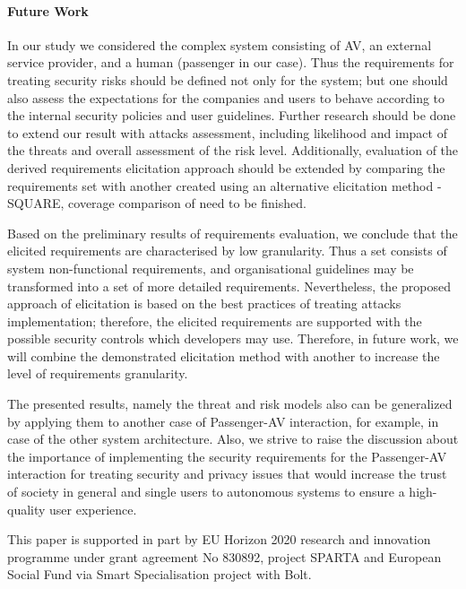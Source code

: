 \documentclass[manuscript]{acmart}
\begin{document}
\paragraph{Future Work} In our study we considered the complex system consisting of AV, an external service provider, and a human (passenger in our case). Thus the requirements for treating security risks should be defined not only for the system; but one should also assess the expectations for the companies and users to behave according to the internal security policies and user guidelines. Further research should be done to extend our result with attacks assessment, including likelihood and impact of the threats and overall assessment of the risk level. Additionally, evaluation of the derived requirements elicitation approach should be extended by comparing the requirements set with another created using an alternative elicitation method - SQUARE, coverage comparison of need to be finished.

Based on the preliminary results of requirements evaluation, we conclude that the elicited requirements are characterised by low granularity. Thus a set consists of system non-functional requirements, and organisational guidelines may be transformed into a set of more detailed requirements. Nevertheless, the proposed approach of elicitation is based on the best practices of treating attacks implementation; therefore, the elicited requirements are supported with the possible security controls which developers may use. Therefore, in future work, we will combine the demonstrated elicitation method with another to increase the level of requirements granularity.

The presented results, namely the threat and risk models also can be generalized by applying them to another case of Passenger-AV interaction, for example, in case of the other system architecture. Also, we strive to raise the discussion about the importance of implementing the security requirements for the Passenger-AV interaction for treating security and privacy issues that would increase the trust of society in general and single users to autonomous systems to ensure a high-quality user experience.



\begin{acks}
 This paper is supported in part by EU Horizon 2020 research and innovation programme under grant agreement No 830892, project SPARTA and European Social Fund via Smart Specialisation project with Bolt.
\end{acks}




\end{document}
